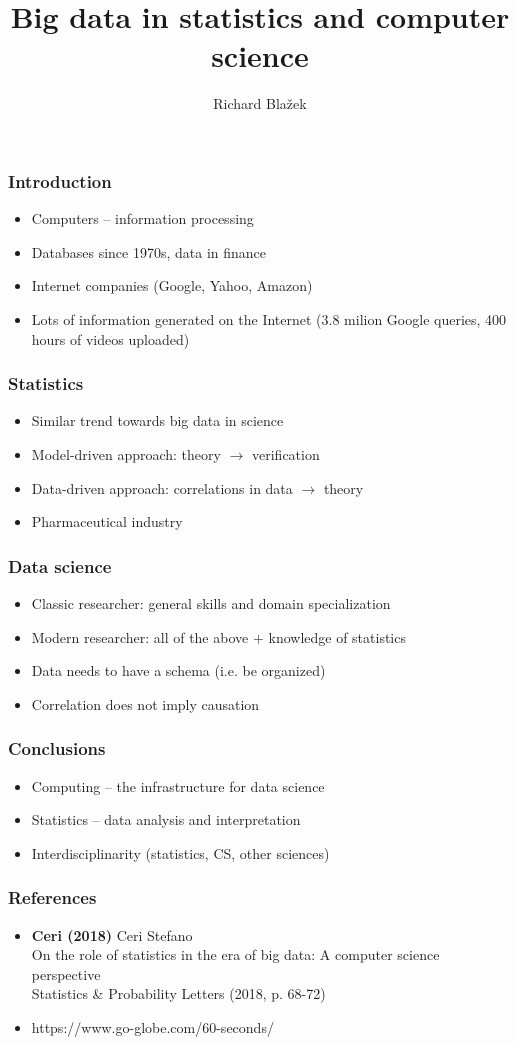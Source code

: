 \documentclass{beamer}
\title{Big data in statistics and computer science}
\author{Richard Blažek}
\date{}
\begin{document}
 \begin{frame}
\titlepage
\end{frame}

\begin{frame}
\frametitle{Introduction}
\begin{itemize}
\item Computers -- information processing
\item Databases since 1970s, data in finance
\item Internet companies (Google, Yahoo, Amazon)
\item Lots of information generated on the Internet (3.8 milion Google queries, 400 hours of videos uploaded)
\end{itemize}
\end{frame}

\begin{frame}
\frametitle{Statistics}
\begin{itemize}
\item Similar trend towards big data in science
\item Model-driven approach: theory $\rightarrow$ verification
\item Data-driven approach: correlations in data $\rightarrow$ theory
\item Pharmaceutical industry
\end{itemize}
\end{frame}

\begin{frame}
\frametitle{Data science}
\begin{itemize}
\item Classic researcher: general skills and domain specialization
\item Modern researcher: all of the above $+$ knowledge of statistics
\item Data needs to have a schema (i.e. be organized)
\item Correlation does not imply causation
\end{itemize}
\end{frame}
\begin{frame}

\frametitle{Conclusions}
\begin{itemize}
\item Computing -- the infrastructure for data science
\item Statistics -- data analysis and interpretation
\item Interdisciplinarity (statistics, CS, other sciences)
\end{itemize}
\end{frame}



\begin{frame}
\frametitle{References}
\begin{itemize}
\item \textbf{Ceri (2018)} Ceri Stefano\\
On the role of statistics in the era of big data: A computer science perspective\\
Statistics \& Probability Letters (2018, p. 68-72)
\item https://www.go-globe.com/60-seconds/
\end{itemize}
\end{frame}
\end{document}
